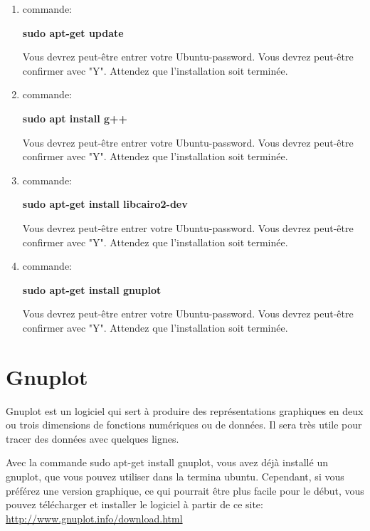 \documentclass{article}
\begin{document}
\begin{enumerate}
\item commande:
\begin{tcolorbox}[width=\textwidth,colframe=BurntOrange,colback={black},title={ubuntu terminal},outer arc=0mm,colupper=white]  
    \large\textbf{  sudo apt-get update }
\end{tcolorbox}
Vous devrez peut-être entrer votre Ubuntu-password. Vous devrez peut-être confirmer avec "Y". Attendez que l'installation soit terminée. 
\item commande:
\begin{tcolorbox}[width=\textwidth,colframe=BurntOrange,colback={black},title={ubuntu terminal},outer arc=0mm,colupper=white]  
    \large\textbf{  sudo apt install g++ }
\end{tcolorbox}
Vous devrez peut-être entrer votre Ubuntu-password. Vous devrez peut-être confirmer avec "Y". Attendez que l'installation soit terminée. 
\item commande:
\begin{tcolorbox}[width=\textwidth,colframe=BurntOrange,colback={black},title={ubuntu terminal},outer arc=0mm,colupper=white]  
   \large\textbf{  sudo apt-get install libcairo2-dev }
\end{tcolorbox}
Vous devrez peut-être entrer votre Ubuntu-password. Vous devrez peut-être confirmer avec "Y". Attendez que l'installation soit terminée. 
\item commande:
\begin{tcolorbox}[width=\textwidth,colframe=BurntOrange,colback={black},title={ubuntu terminal},outer arc=0mm,colupper=white]  
    \large\textbf{  sudo apt-get install gnuplot }
\end{tcolorbox}
Vous devrez peut-être entrer votre Ubuntu-password. Vous devrez peut-être confirmer avec "Y". Attendez que l'installation soit terminée. 
\end{enumerate}

\section{Gnuplot}
Gnuplot est un logiciel qui sert à produire des représentations graphiques en deux ou trois dimensions de fonctions numériques ou de données. Il sera très utile pour tracer des données avec quelques lignes. 

Avec la commande sudo apt-get install gnuplot, vous avez déjà installé un gnuplot, que vous pouvez utiliser dans la termina ubuntu. Cependant, si vous préférez une version graphique, ce qui pourrait être plus facile pour le début, vous pouvez télécharger et installer le logiciel à partir de ce site: \href{http://www.gnuplot.info/download.html}{http://www.gnuplot.info/download.html} 
\end{document}
